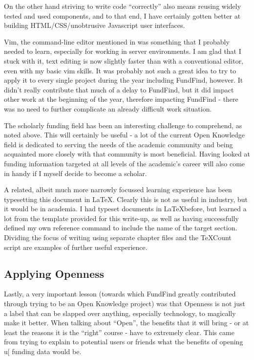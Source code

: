 On the other hand striving to write code ``correctly'' also means reusing widely tested and used components, and to that end, I have certainly gotten better at building HTML/CSS/unobtrusive Javascript user interfaces.

Vim, the command-line editor mentioned in  was something that I probably needed to learn, especially for working in server environments. I am glad that I stuck with it, text editing is now slightly faster than with a conventional editor, even with my basic vim skills. It was probably not such a great idea to try to apply it to every single project during the year including FundFind, however. It didn't really contribute that much of a delay to FundFind, but it did impact other work at the beginning of the year, therefore impacting FundFind - there was no need to further complicate an already difficult work situation.

The scholarly funding field has been an interesting challenge to comprehend, as noted above. This will certainly be useful - a lot of the current Open Knowledge field is dedicated to serving the needs of the academic community and being acquainted more closely with that community is most beneficial. Having looked at funding information targeted at all levels of the academic's career will also come in handy if I myself decide to become a scholar.

A related, albeit much more narrowly focussed learning experience has been typesetting this document in \LaTeX. Clearly this is not as useful in industry, but it would be in academia. I had typeset documents in \LaTeX before, but learned a lot from the template provided for this write-up, as well as having successfully defined my own reference command to include the name of the target section. Dividing the focus of writing using separate chapter files and the TeXCount \cite{texcount} script are examples of further useful experience.

\subsection{Applying Openness}
Lastly, a very important lesson (towards which FundFind greatly contributed through trying to be an Open Knowledge project) was that Openness is not just a label that can be slapped over anything, especially technology, to magically make it better. When talking about ``Open'', the benefits that it will bring - or at least the reasons it is the ``right'' course - have to extremely clear. This came from trying to explain to potential users or friends what the benefits of opening u[ funding data would be.

